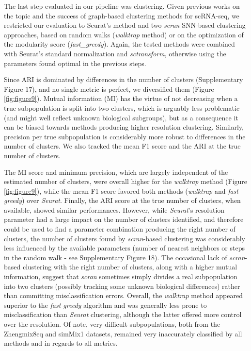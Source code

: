 \documentclass{bmcart}
\begin{document}
The last step evaluated in our pipeline was clustering. Given previous works on the topic \citep{duoClustering2018,freytagComparison2018} and the success of graph-based clustering methods for scRNA-seq, we restricted our evaluation to Seurat's method and two \textit{scran} SNN-based clustering approaches, based on random walks (\textit{walktrap} method) or on the optimization of the modularity score (\textit{fast\_greedy}). Again, the tested methods were combined with Seurat's standard normalization and \textit{sctransform}, otherwise using the parameters found optimal in the previous steps. 

Since ARI is dominated by differences in the number of clusters (Supplementary Figure 17), and no single metric is perfect, we diversified them (Figure \ref{fig:figure9}). Mutual information (MI) has the virtue of not decreasing when a true subpopulation is split into two clusters, which is arguably less problematic (and might well reflect unknown biological subgroups), but as a consequence it can be biased towards methods producing higher resolution clustering. Similarly, precision per true subpopulation is considerably more robust to differences in the number of clusters. We also tracked the mean F1 score and the ARI at the true number of clusters. 

The MI score and minimum precision, which are largely independent of the estimated number of clusters, were overall higher for the \textit{walktrap} method (Figure \ref{fig:figure9}), while the mean F1 score favored both  methods (\textit{walktrap} and \textit{fast greedy}) over \textit{Seurat}. Finally, the ARI score at the true number of clusters, when available, showed similar performances. However, while \textit{Seurat}'s resolution parameter had a large impact on the number of clusters identified, and therefore could be used to find a parameter combination producing the right number of clusters, the number of clusters found by \textit{scran}-based clustering was considerably less influenced by the available parameters (number of nearest neighbors or steps in the random walk - see Supplementary Figure 18). The occasional lack of \textit{scran}-based clustering with the right number of clusters, along with a higher mutual information, suggest that \textit{scran} sometimes simply divides a real subpopulation into two clusters (possibly tracking some unknown biological differences) rather than committing misclassification errors. Overall, the \textit{walktrap} method appeared superior to the \textit{fast greedy} algorithm and was generally less prone to misclassification than \textit{Seurat} clustering, although the latter offered more control over the resolution. Of note, very difficult subpopulations, both from the Zhengmix8eq and simMix1 datasets, remained very inaccurately classified by all methods and in regards to all metrics.
\end{document}
